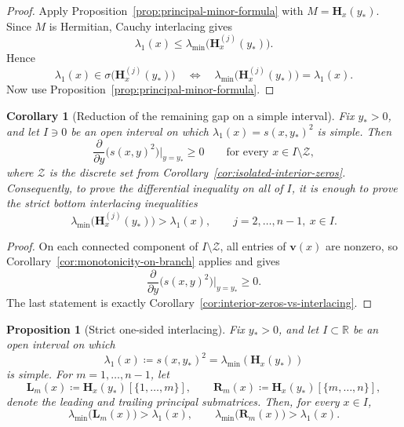 \documentclass[11pt]{article}
\newtheorem{proposition}[theorem]{Proposition}
\newtheorem{corollary}[theorem]{Corollary}
\begin{document}
\begin{proof}
Apply Proposition~\ref{prop:principal-minor-formula} with \(M=\mathbf H_x(y_*)\). Since \(M\) is Hermitian, Cauchy interlacing gives
\[
\lambda_1(x)\le \lambda_{\min}\!\bigl(\mathbf H_x^{(j)}(y_*)\bigr).
\]
Hence
\[
\lambda_1(x)\in \sigma\!\bigl(\mathbf H_x^{(j)}(y_*)\bigr)
\quad\Longleftrightarrow\quad
\lambda_{\min}\!\bigl(\mathbf H_x^{(j)}(y_*)\bigr)=\lambda_1(x).
\]
Now use Proposition~\ref{prop:principal-minor-formula}.
\end{proof}

\begin{corollary}[Reduction of the remaining gap on a simple interval]\label{cor:remaining-gap-simple-interval}
Fix \(y_*>0\), and let \(I\ni 0\) be an open interval on which \(\lambda_1(x)=s(x,y_*)^2\) is simple. Then
\[
\frac{\partial}{\partial y}\bigl(s(x,y)^2\bigr)\Big|_{y=y_*}\ge 0
\qquad
\text{for every }x\in I\setminus\mathcal Z,
\]
where \(\mathcal Z\) is the discrete set from Corollary~\ref{cor:isolated-interior-zeros}. Consequently, to prove the differential inequality on all of \(I\), it is enough to prove the strict bottom interlacing inequalities
\[
\lambda_{\min}\!\bigl(\mathbf H_x^{(j)}(y_*)\bigr)>\lambda_1(x),
\qquad
j=2,\dots,n-1,\ x\in I.
\]
\end{corollary}

\begin{proof}
On each connected component of \(I\setminus\mathcal Z\), all entries of \(\mathbf v(x)\) are nonzero, so Corollary~\ref{cor:monotonicity-on-branch} applies and gives
\[
\frac{\partial}{\partial y}\bigl(s(x,y)^2\bigr)\Big|_{y=y_*}\ge 0.
\]
The last statement is exactly Corollary~\ref{cor:interior-zeros-vs-interlacing}.
\end{proof}


\begin{proposition}[Strict one-sided interlacing]\label{prop:strict-one-sided-interlacing}
Fix \(y_*>0\), and let \(I\subset\mathbb R\) be an open interval on which
\[
\lambda_1(x)\coloneqq s(x,y_*)^2=\lambda_{\min}(\mathbf H_x(y_*))
\]
is simple. For \(m=1,\dots,n-1\), let
\[
\mathbf L_m(x)\coloneqq \mathbf H_x(y_*)[\{1,\dots,m\}],
\qquad
\mathbf R_m(x)\coloneqq \mathbf H_x(y_*)[\{m,\dots,n\}],
\]
denote the leading and trailing principal submatrices. Then, for every \(x\in I\),
\[
\lambda_{\min}\bigl(\mathbf L_m(x)\bigr)>\lambda_1(x),
\qquad
\lambda_{\min}\bigl(\mathbf R_m(x)\bigr)>\lambda_1(x).
\]
\end{proposition}
\end{document}
